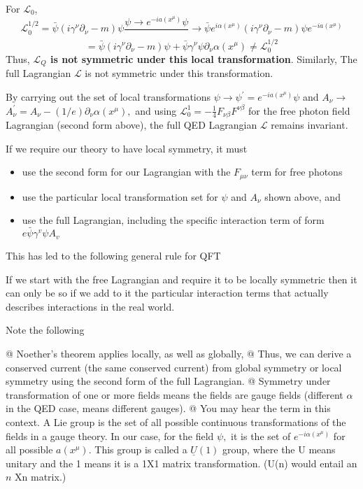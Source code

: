 For $\mathcal{L_0}$,
$$
\mathcal{L}_{0}^{1 / 2}=\bar{\psi}\left(i \gamma^{\nu} \partial_{\nu}-m\right) \psi \frac{\psi \rightarrow e^{-i a\left(x^{\mu}\right)} \psi}{ }\rightarrow \bar{\psi} e^{i \alpha\left(x^{\mu}\right)}\left(i \gamma^{\nu} \partial_{\nu}-m\right) \psi e^{-i a\left(x^{\mu}\right)}
$$
$$
=\bar{\psi}\left(i \gamma^{\nu} \partial_{\nu}-m\right) \psi+\bar{\psi} \gamma^{\nu} \psi \partial_{\nu} \alpha\left(x^{\mu}\right)\neq \mathcal{L}_0^{1/2}
$$
Thus, \textbf{$\mathcal{L}_{Q}$ is not symmetric under this local transformation}. Similarly, The full Lagrangian $\mathcal{L}$ is not symmetric under this transformation.
\begin{qt}
    By carrying out the set of local transformations $\psi \rightarrow \psi^{\prime}=e^{-i a\left(x^{\mu}\right)} \psi$ and $A_{\nu} \rightarrow$ $A^{\prime}_{\nu}=A_{\nu}-(1 / e) \partial_{\nu} \alpha\left(x^{\mu}\right),$ and using $\mathcal{L}_{0}^{1}=-\frac{1}{4} F_{\nu \beta} F^{\nu \beta}$ for the free photon field Lagrangian (second form above), the full QED Lagrangian $\mathcal{L}$ remains invariant.
\end{qt}
If we require our theory to have local symmetry, it must
\begin{itemize}
    \item use the second form for our Lagrangian with the $F_{\mu\nu}$ term for free photons
\item  use the particular local transformation set for $\psi$ and $A_{\nu}$ shown above, and
\item use the full Lagrangian, including the specific interaction term of form $e \bar{\psi} \gamma^{v} \psi A_{v}$
\end{itemize}
This has led to the following general rule for QFT
\begin{qt}
    If we start with the free Lagrangian and require it to be locally symmetric then it can only be so if we add to it the particular interaction terms that actually describes interactions in the real world.
\end{qt}
Note the following
\begin{qt}
    \begin{easylist}
    \NewList
    @ Noether's theorem applies locally, as well as globally,
    @ Thus, we can derive a conserved current (the same conserved current) from global symmetry or local symmetry using the second form of the full Lagrangian.
    @ Symmetry under transformation of one or more fields means the fields are gauge fields (different $\alpha$ in the QED case, means different gauges).
    @ You may hear the term  in this context. A Lie group is the set of all possible continuous transformations of the fields in a gauge theory. In our case, for the field $\psi,$ it is the set of $e^{-i \alpha\left(x^{\mu}\right)}$ for all possible $a\left(x^{\mu}\right) .$ This group is called a $\underline{U}(1)$ group, where the U means unitary and the 1 means it is a 1X1 matrix transformation. (U(n) would entail an $n$ Xn matrix.)
    \end{easylist}
\end{qt}
